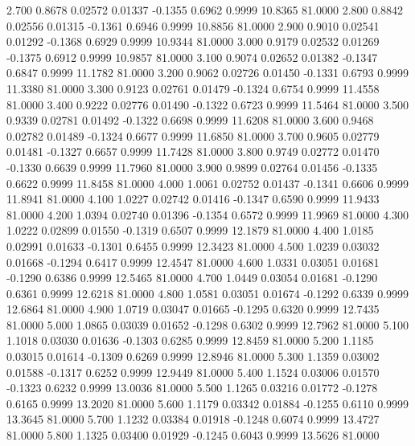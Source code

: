    2.700   0.8678   0.02572   0.01337  -0.1355   0.6962   0.9999  10.8365  81.0000
   2.800   0.8842   0.02556   0.01315  -0.1361   0.6946   0.9999  10.8856  81.0000
   2.900   0.9010   0.02541   0.01292  -0.1368   0.6929   0.9999  10.9344  81.0000
   3.000   0.9179   0.02532   0.01269  -0.1375   0.6912   0.9999  10.9857  81.0000
   3.100   0.9074   0.02652   0.01382  -0.1347   0.6847   0.9999  11.1782  81.0000
   3.200   0.9062   0.02726   0.01450  -0.1331   0.6793   0.9999  11.3380  81.0000
   3.300   0.9123   0.02761   0.01479  -0.1324   0.6754   0.9999  11.4558  81.0000
   3.400   0.9222   0.02776   0.01490  -0.1322   0.6723   0.9999  11.5464  81.0000
   3.500   0.9339   0.02781   0.01492  -0.1322   0.6698   0.9999  11.6208  81.0000
   3.600   0.9468   0.02782   0.01489  -0.1324   0.6677   0.9999  11.6850  81.0000
   3.700   0.9605   0.02779   0.01481  -0.1327   0.6657   0.9999  11.7428  81.0000
   3.800   0.9749   0.02772   0.01470  -0.1330   0.6639   0.9999  11.7960  81.0000
   3.900   0.9899   0.02764   0.01456  -0.1335   0.6622   0.9999  11.8458  81.0000
   4.000   1.0061   0.02752   0.01437  -0.1341   0.6606   0.9999  11.8941  81.0000
   4.100   1.0227   0.02742   0.01416  -0.1347   0.6590   0.9999  11.9433  81.0000
   4.200   1.0394   0.02740   0.01396  -0.1354   0.6572   0.9999  11.9969  81.0000
   4.300   1.0222   0.02899   0.01550  -0.1319   0.6507   0.9999  12.1879  81.0000
   4.400   1.0185   0.02991   0.01633  -0.1301   0.6455   0.9999  12.3423  81.0000
   4.500   1.0239   0.03032   0.01668  -0.1294   0.6417   0.9999  12.4547  81.0000
   4.600   1.0331   0.03051   0.01681  -0.1290   0.6386   0.9999  12.5465  81.0000
   4.700   1.0449   0.03054   0.01681  -0.1290   0.6361   0.9999  12.6218  81.0000
   4.800   1.0581   0.03051   0.01674  -0.1292   0.6339   0.9999  12.6864  81.0000
   4.900   1.0719   0.03047   0.01665  -0.1295   0.6320   0.9999  12.7435  81.0000
   5.000   1.0865   0.03039   0.01652  -0.1298   0.6302   0.9999  12.7962  81.0000
   5.100   1.1018   0.03030   0.01636  -0.1303   0.6285   0.9999  12.8459  81.0000
   5.200   1.1185   0.03015   0.01614  -0.1309   0.6269   0.9999  12.8946  81.0000
   5.300   1.1359   0.03002   0.01588  -0.1317   0.6252   0.9999  12.9449  81.0000
   5.400   1.1524   0.03006   0.01570  -0.1323   0.6232   0.9999  13.0036  81.0000
   5.500   1.1265   0.03216   0.01772  -0.1278   0.6165   0.9999  13.2020  81.0000
   5.600   1.1179   0.03342   0.01884  -0.1255   0.6110   0.9999  13.3645  81.0000
   5.700   1.1232   0.03384   0.01918  -0.1248   0.6074   0.9999  13.4727  81.0000
   5.800   1.1325   0.03400   0.01929  -0.1245   0.6043   0.9999  13.5626  81.0000
